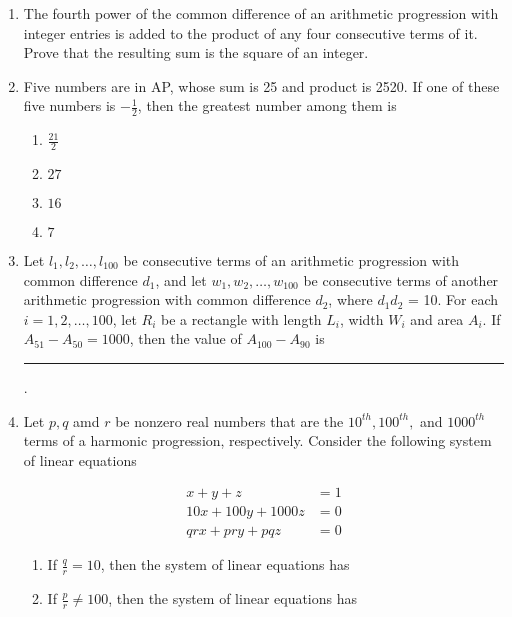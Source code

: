 \begin{enumerate}    [label=\thesubsection.\arabic*, ref=\thesubsection.\theenumi]
%       
			\hfill {}
%      
%
%
      \item The fourth power of the common difference of an arithmetic progression with integer entries is added to the product of any four consecutive terms of it. Prove that the resulting sum is the square of an integer.
%      
	      \hfill {}
%    
\item     Five numbers are in AP, whose sum is 25 and product is 2520. If one of these five numbers is $-\frac{1}{2}$, then the greatest number among them is
\hfill {}
%
\begin{multicols}{4}
\begin{enumerate}    
\item     $\frac{21}{2}$
\item     $27$
\item     $16$
\item     $7$
\end{enumerate}
\end{multicols}
%
%     
%
\item     Let $l_1,l_2,\dots,l_{100}$ be consecutive terms of an arithmetic progression with common difference $d_1$, and let $w_1, w_2, \dots , w_{100}$ be consecutive terms of another arithmetic progression with common difference $d_2 $, where $d_1d_2$ = 10. For each $i = 1, 2,\dots,100$, let $R_i$ be a rectangle with length $L_i$, width $W_i$ and area $A_i$. If $A_{51}-A_{50}=1000$, then the value of $A_{100}-A_{90}$ is \rule{1cm}{0.1pt}.
	\hfill {}
\item     Let $p,q$ amd $r$  be nonzero real numbers that are the $10^{th}, 100^{th},$ and $1000^{th}$ terms of a harmonic progression, respectively. Consider the following system of linear equations

	\hfill {}
\begin{align*}
x + y + z &= 1
\\
10x + 100y + 1000z &= 0
\\
qr x + pr y + pq z &= 0
\end{align*}

		\begin{multicols}{2}
			\begin{enumerate}[label=(\Roman*)]		
\item     If $ \frac{q}{r} = 10 $, then the system of linear equations has 

\item      If $ \frac{p}{r} \neq 100 $, then the system of linear equations has 


\end{enumerate}
\end{multicols}
\end{enumerate}

